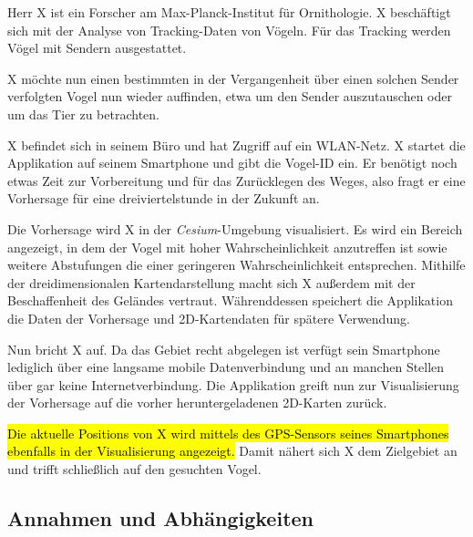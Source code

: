 \documentclass[12pt]{article} %
\begin{document}
\begin{displayquote}
\small
Herr X ist ein Forscher am Max-Planck-Institut für Ornithologie. X beschäftigt sich mit der Analyse von Tracking-Daten von Vögeln. Für das Tracking werden Vögel mit Sendern ausgestattet. 

X möchte nun einen bestimmten in der Vergangenheit über einen solchen Sender verfolgten Vogel nun wieder auffinden, etwa um den Sender auszutauschen oder um das Tier zu betrachten.

X befindet sich in seinem Büro und hat Zugriff auf ein WLAN-Netz. X startet die Applikation auf seinem Smartphone und gibt die Vogel-ID ein. Er benötigt noch etwas Zeit zur Vorbereitung und für das Zurücklegen des Weges, also fragt er eine Vorhersage für eine dreiviertelstunde in der Zukunft an.

Die Vorhersage wird X in der \textit{Cesium}-Umgebung visualisiert. Es wird ein Bereich angezeigt, in dem der Vogel mit hoher Wahrscheinlichkeit anzutreffen ist sowie weitere Abstufungen die einer geringeren Wahrscheinlichkeit entsprechen. Mithilfe der dreidimensionalen Kartendarstellung macht sich X außerdem mit der Beschaffenheit des Geländes vertraut. Währenddessen speichert die Applikation die Daten der Vorhersage und 2D-Kartendaten für spätere Verwendung.

Nun bricht X auf. Da das Gebiet recht abgelegen ist verfügt sein Smartphone lediglich über eine langsame mobile Datenverbindung und an manchen Stellen über gar keine Internetverbindung. Die Applikation greift nun zur Visualisierung der Vorhersage auf die vorher heruntergeladenen 2D-Karten zurück.

\hl{Die aktuelle Positions von X wird mittels des GPS-Sensors seines Smartphones ebenfalls in der Visualisierung angezeigt.} Damit nähert sich X dem Zielgebiet an und trifft schließlich auf den gesuchten Vogel.
\end{displayquote}


\subsection{Annahmen und Abhängigkeiten}

\end{document}
